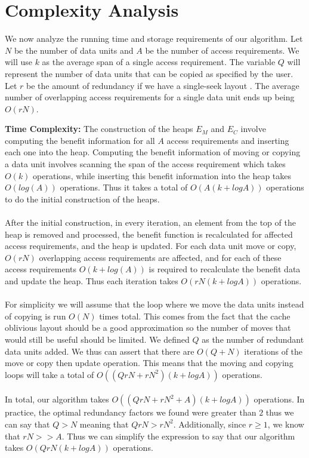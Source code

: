 \section{Complexity Analysis}

We now analyze the running time and storage requirements of our algorithm. Let $N$ be the number of data units and $A$ be the number of access requirements. We will use $k$ as the average span of a single access requirement. The variable $Q$ will represent the number of data units that can be copied as specified by the user. Let $r$ be the amount of redundancy if we have a single-seek layout \cite{singleseeklayout}. The average number of overlapping access requirements for a single data unit ends up being $O(rN)$. 

{\bf Time Complexity:} The construction of the heaps $E_M$ and $E_C$ involve computing the benefit information for all $A$ access requirements and inserting each one into the heap. Computing the benefit information of moving or copying a data unit involves scanning the span of the access requirement which takes $O(k)$ operations, while inserting this benefit information into the heap takes $O(log (A))$ operations. Thus it takes a total of $O(A (k + logA))$ operations to do the initial construction of the heaps. \\
\\
After the initial construction, in every iteration, an element from the top of the heap is removed and processed, the benefit function is recalculated for affected access requirements, and the heap is updated. For each data unit move or copy, $O(rN)$ overlapping access requirements are affected, and for each of these access requirements $O(k+log(A))$ is required to recalculate the benefit data and update the heap. Thus each iteration takes $O(rN(k + logA))$ operations.\\
\\
For simplicity we will assume that the loop where we move the data units instead of copying is run $O(N)$ times total. This comes from the fact that the cache oblivious layout \cite{cacheobliviouslayout} should be a good approximation so the number of moves that would still be useful should be limited. We defined $Q$ as the number of redundant data units added. We thus can assert that there are $O(Q + N)$ iterations of the move or copy then update operation. This means that the moving and copying loops will take a total of $O((QrN + rN^2)(k + logA))$ operations. \\
\\
In total, our algorithm takes $O((QrN + rN^2 + A)(k + logA))$ operations. In practice, the optimal redundancy factors we found were greater than $2$ thus we can say that $Q > N$ meaning that $QrN > rN^2$. Additionally, since $r \geq 1$, we know that $rN > > A$. Thus we can simplify the expression to say that our algorithm takes $O(QrN(k + logA))$ operations. 

